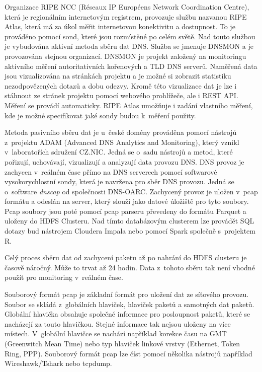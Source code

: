 \documentclass[thesis=M,czech]{src/FITthesis}[2019/12/23]
\begin{document}
Organizace RIPE NCC (Réseaux IP Européens Network Coordination Centre), která je regionálním internetovým registrem, provozuje službu nazvanou RIPE Atlas, která má za úkol měřit internetovou konektivitu a dostupnost. To je prováděno pomocí sond, které jsou rozmístěné po celém světě. Nad touto službou je vybudována aktivní metoda sběru dat DNS. Služba se jmenuje DNSMON a je provozována stejnou organizací. DNSMON je projekt založený na monitoringu aktivního měření autoritativních kořenových a TLD DNS serverů. Naměřená data jsou vizualizována na stránkách projektu a je možné si zobrazit statistiku nezodpovězených dotazů a dobu odezvy. Kromě této vizualizace dat je lze i stáhnout ze stránek projektu pomocí webového prohlížeče, ale i REST API. Měření se provádí automaticky. RIPE Atlas umožňuje i zadání vlastního měření, kde je možné specifikovat jaké sondy budou k~měření použity. \cite{ripe-about, ripe-dnsmon}


Metoda pasivního sběru dat je u~české domény prováděna pomocí nástrojů z~projektu ADAM (Advanced DNS Analytics and Monitoring), který vznikl v~laboratořích sdružení CZ.NIC. Jedná se o~sadu nástrojů a metod, které pořizují, uchovávají, vizualizují a analyzují data provozu DNS. DNS provoz je zachycen v~reálném čase přímo na DNS serverech pomocí softwarové vysokorychlostní sondy, která je navržena pro sběr DNS provozu. Jedná se o~software \textit{dnscap} od společnosti DNS-OARC. Zachycený provoz je uložen v~pcap formátu a odeslán na server, který slouží jako datové úložiště pro tyto soubory. Pcap soubory jsou poté pomocí pcap parseru převedeny do formátu Parquet a uloženy do HDFS Clusteru. Nad tímto databázovým clusterem lze provádět SQL dotazy buď nástrojem Cloudera Impala nebo pomocí Spark společně s~projektem R.  

Celý proces sběru dat od zachycení paketu až po nahrání do HDFS clusteru je časově náročný. Může to trvat až 24 hodin. Data z~tohoto sběru tak není vhodné použít pro monitoring v~reálném čase. 

Souborový formát pcap je základní formát pro uložení dat ze síťového provozu. Soubor se skládá z~globálních hlaviček, hlaviček paketů a samotných dat paketů. Globální hlavička obsahuje společné informace pro posloupnost paketů, které se nacházejí za touto hlavičkou. Stejné informace tak nejsou uloženy na více místech. V~globální hlavičce se nachází například korekce času na GMT (Greenwitch Mean Time) nebo typ hlaviček linkové vrstvy (Ethernet, Token Ring, PPP). Souborový formát pcap lze číst pomocí několika nástrojů například Wireshawk/Tshark nebo tcpdump. \cite{wire-pcap}
\end{document}
